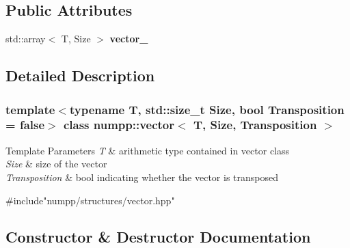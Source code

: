 \subsection*{Public Attributes}
\begin{DoxyCompactItemize}
\item 
\mbox{\label{classnumpp_1_1vector_a470ac88412839d0a338761e13103aa38}} 
std\+::array$<$ T, Size $>$ {\bfseries vector\+\_\+}
\end{DoxyCompactItemize}


\subsection{Detailed Description}
\subsubsection*{template$<$typename T, std\+::size\+\_\+t Size, bool Transposition = false$>$\newline
class numpp\+::vector$<$ T, Size, Transposition $>$}


\begin{DoxyTemplParams}{Template Parameters}
{\em T} & arithmetic type contained in vector class \\
\hline
{\em Size} & size of the vector \\
\hline
{\em Transposition} & bool indicating whether the vector is transposed\\
\hline
\end{DoxyTemplParams}

\begin{DoxyCode}
\textcolor{preprocessor}{#include"numpp/structures/vector.hpp"}
\end{DoxyCode}
 

\subsection{Constructor \& Destructor Documentation}
\mbox{\label{classnumpp_1_1vector_ac94f1a73274a498f76425a84cf6e395b}} 
